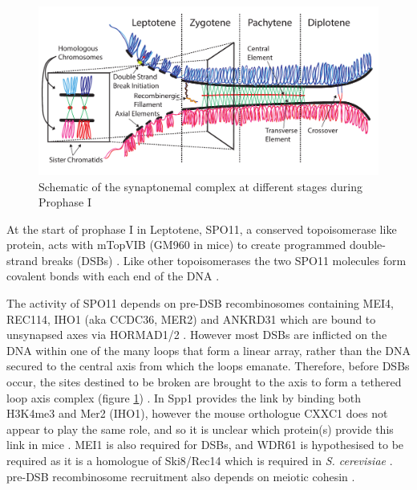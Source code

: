 \begin{figure}[H]
	\centering
	\includegraphics[width=\textwidth]{figures/intro/synaptonemal_complex.pdf}
	\caption[Synaptonemal Complex]{Schematic of the synaptonemal complex at different stages during Prophase I~\parencite[based on ][]{Gaysinskaya2018MOESM1, Gaysinskaya2018Transient, Cohen2010Predicting, Bolcun-Filas2012Chapter, Hughes2018Female, Cahoon2017Superresolution}}
	\label{fig:synaptonemal_complex}
\end{figure}

At the start of prophase I in Leptotene, SPO11, a conserved topoisomerase like protein, acts with mTopVIB (GM960 in mice) to create programmed double-strand breaks (DSBs) \parencite{Sun1989Doublestrand, Keeney1997MeiosisSpecific, Bergerat1997atypical, Cole2012Homeostatic, Vrielynck2016DNA, Robert2016TopoVIBLike, Li2019highresolution}.
Like other topoisomerases the two SPO11 molecules form covalent bonds with each end of the DNA \parencite{Neale2005Endonucleolytic}.

The activity of SPO11 depends on pre-DSB recombinosomes containing MEI4, REC114, IHO1 (aka CCDC36, MER2) and ANKRD31 which are bound to unsynapsed axes via HORMAD1/2 \parencite{Kumar2010Functional,Panizza2011Spo11Accessory, Stanzione2016Meiotic, Kumar2018Mouse, Papanikos2019Mouse, Boekhout2019REC114}.
However most DSBs are inflicted on the DNA within one of the many loops that form a linear array, rather than the DNA secured to the central axis from which the loops emanate.
Therefore, before DSBs occur, the sites destined to be broken are brought to the axis to form a tethered loop axis complex (figure \ref{fig:synaptonemal_complex}) \parencite{Blat,Panizza2011Spo11Accessory}.
In  Spp1 provides the link by binding both H3K4me3 and Mer2 (IHO1), however the mouse orthologue CXXC1 does not appear to play the same role, and so it is unclear which protein(s) provide this link in mice \cite{Acquaviva2013COMPASS,Sommermeyer2013Spp1,Tian2018CXXC1}.
MEI1 is also required for DSBs, and WDR61 is hypothesised to be required as it is a homologue of Ski8/Rec14 which is required in \textit{S. cerevisiae} \parencite[reviewed in][]{Kumar2010Initiation, Lam2015Mechanism}.
pre-DSB recombinosome recruitment also depends on meiotic cohesin \parencite{Bhattacharyya2019Prdm9}.

